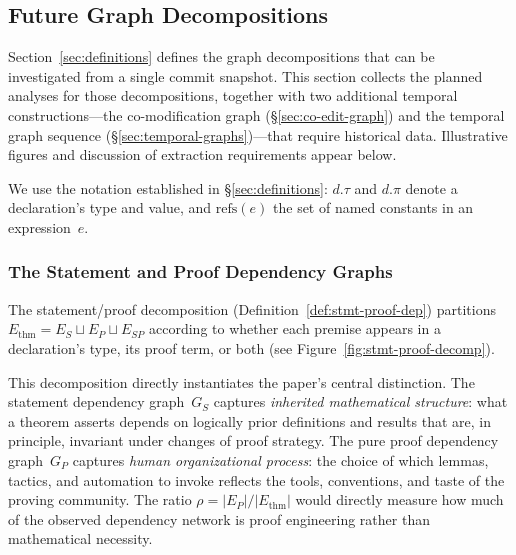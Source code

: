 \subsection{Future Graph Decompositions}
\label{sec:future-graphs}

Section~\ref{sec:definitions} defines the graph decompositions that can be investigated from a single commit snapshot. This section collects the planned analyses for those decompositions, together with two additional temporal constructions---the co-modification graph (\S\ref{sec:co-edit-graph}) and the temporal graph sequence (\S\ref{sec:temporal-graphs})---that require historical data. Illustrative figures and discussion of extraction requirements appear below. 

We use the notation established in \S\ref{sec:definitions}: $d.\tau$ and $d.\pi$ denote a declaration's type and value, and $\mathrm{refs}(e)$ the set of named constants in an expression~$e$.

\subsubsection{The Statement and Proof Dependency Graphs}
\label{sec:stmt-proof-graph}

The statement/proof decomposition (Definition~\ref{def:stmt-proof-dep}) partitions $E_{\mathrm{thm}} = E_S \sqcup E_P \sqcup E_{SP}$ according to whether each premise appears in a declaration's type, its proof term, or both (see Figure~\ref{fig:stmt-proof-decomp}).

This decomposition directly instantiates the paper's central distinction. The statement dependency graph~$G_S$ captures \emph{inherited mathematical structure}: what a theorem asserts depends on logically prior definitions and results that are, in principle, invariant under changes of proof strategy. The pure proof dependency graph~$G_P$ captures \emph{human organizational process}: the choice of which lemmas, tactics, and automation to invoke reflects the tools, conventions, and taste of the proving community. The ratio $\rho = |E_P| / |E_{\mathrm{thm}}|$ would directly measure how much of the observed dependency network is proof engineering rather than mathematical necessity.

